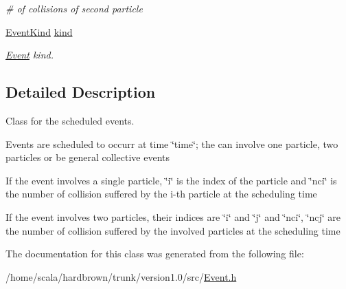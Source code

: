 \begin{CompactItemize}
\begin{CompactList}\small\item\em \# of collisions of second particle \item\end{CompactList}\item 
\hypertarget{classEvent_628b64ab207ec0d57a24c5b9b73e8540}{
\hyperlink{Event_8h_d6ef938e753c4f7df22352292640e8cf}{EventKind} \hyperlink{classEvent_628b64ab207ec0d57a24c5b9b73e8540}{kind}}
\label{classEvent_628b64ab207ec0d57a24c5b9b73e8540}

\begin{CompactList}\small\item\em \hyperlink{classEvent}{Event} kind. \item\end{CompactList}\end{CompactItemize}


\subsection{Detailed Description}
Class for the scheduled events. 

Events are scheduled to occurr at time \char`\"{}time\char`\"{}; the can involve one particle, two particles or be general collective events

If the event involves a single particle, \char`\"{}i\char`\"{} is the index of the particle and \char`\"{}nci\char`\"{} is the number of collision suffered by the i-th particle at the scheduling time

If the event involves two particles, their indices are \char`\"{}i\char`\"{} and \char`\"{}j\char`\"{} and \char`\"{}nci\char`\"{}, \char`\"{}ncj\char`\"{} are the number of collision suffered by the involved particles at the scheduling time 

The documentation for this class was generated from the following file:\begin{CompactItemize}
\item 
/home/scala/hardbrown/trunk/version1.0/src/\hyperlink{Event_8h}{Event.h}\end{CompactItemize}
